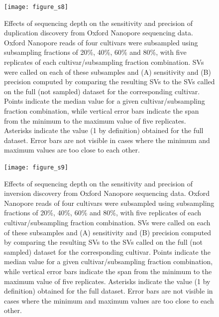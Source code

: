 \documentclass[12pt]{article}
\newenvironment{cfigure}
	{\begin{figure} \centering}
	{\end{figure}}
\begin{document}
\clearpage%

\begin{cfigure}
	\texttt{[image: figure\_s8]}

	\caption[Effects of sequencing depth on the sensitivity and precision of duplication discovery from Oxford Nanopore sequencing data]{
		Effects of sequencing depth on the sensitivity and precision of duplication discovery from Oxford Nanopore sequencing data.
		Oxford Nanopore reads of four cultivars were subsampled using subsampling fractions of 20\%, 40\%, 60\% and 80\%, with five replicates of each cultivar/subsampling fraction combination.
		SVs were called on each of these subsamples and (A) sensitivity and (B) precision computed by comparing the resulting SVs to the SVs called on the full (not sampled) dataset for the corresponding cultivar.
		Points indicate the median value for a given cultivar/subsampling fraction combination, while vertical error bars indicate the span from the minimum to the maximum value of five replicates.
		Asterisks indicate the value (1 by definition) obtained for the full dataset.
		Error bars are not visible in cases where the minimum and maximum values are too close to each other.
}

\label{fig_s8}

\end{cfigure}

\clearpage%

\begin{cfigure}
	\texttt{[image: figure\_s9]}

	\caption[Effects of sequencing depth on the sensitivity and precision of inversion discovery from Oxford Nanopore sequencing data]{
		Effects of sequencing depth on the sensitivity and precision of inversion discovery from Oxford Nanopore sequencing data.
		Oxford Nanopore reads of four cultivars were subsampled using subsampling fractions of 20\%, 40\%, 60\% and 80\%, with five replicates of each cultivar/subsampling fraction combination.
		SVs were called on each of these subsamples and (A) sensitivity and (B) precision computed by comparing the resulting SVs to the SVs called on the full (not sampled) dataset for the corresponding cultivar.
		Points indicate the median value for a given cultivar/subsampling fraction combination, while vertical error bars indicate the span from the minimum to the maximum value of five replicates.
		Asterisks indicate the value (1 by definition) obtained for the full dataset.
		Error bars are not visible in cases where the minimum and maximum values are too close to each other.
}

\label{fig_s9}

\end{cfigure}
\end{document}
